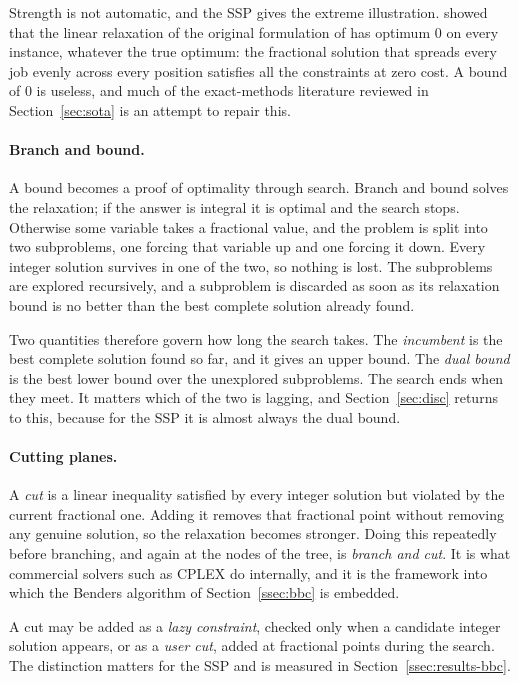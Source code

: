 Strength is not automatic, and the SSP gives the extreme illustration.
\citet{Laporte2004} showed that the linear relaxation of the original formulation of
\citet{Tang1988} has optimum $0$ on every instance, whatever the true optimum: the
fractional solution that spreads every job evenly across every position satisfies all
the constraints at zero cost. A bound of $0$ is useless, and much of the
exact-methods literature reviewed in Section~\ref{sec:sota} is an attempt to repair
this.

\paragraph{Branch and bound.}
A bound becomes a proof of optimality through search. Branch and bound solves the
relaxation; if the answer is integral it is optimal and the search stops. Otherwise
some variable takes a fractional value, and the problem is split into two
subproblems, one forcing that variable up and one forcing it down. Every integer
solution survives in one of the two, so nothing is lost. The subproblems are
explored recursively, and a subproblem is discarded as soon as its relaxation bound
is no better than the best complete solution already found.

Two quantities therefore govern how long the search takes. The \emph{incumbent} is
the best complete solution found so far, and it gives an upper bound. The
\emph{dual bound} is the best lower bound over the unexplored subproblems. The
search ends when they meet. It matters which of the two is lagging, and
Section~\ref{sec:disc} returns to this, because for the SSP it is almost always the
dual bound.

\paragraph{Cutting planes.}
A \emph{cut} is a linear inequality satisfied by every integer solution but violated
by the current fractional one. Adding it removes that fractional point without
removing any genuine solution, so the relaxation becomes stronger. Doing this
repeatedly before branching, and again at the nodes of the tree, is
\emph{branch and cut}. It is what commercial solvers such as CPLEX do internally, and
it is the framework into which the Benders algorithm of Section~\ref{ssec:bbc} is
embedded.

A cut may be added as a \emph{lazy constraint}, checked only when a candidate
integer solution appears, or as a \emph{user cut}, added at fractional points during
the search. The distinction matters for the SSP and is measured in
Section~\ref{ssec:results-bbc}.

